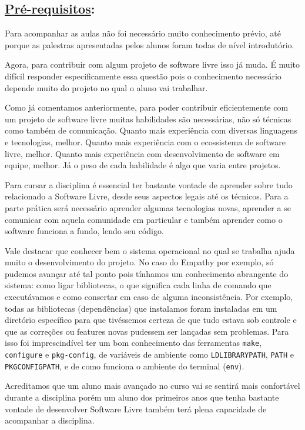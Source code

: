 \subsection*{\underline{Pré-requisitos}:}

Para acompanhar as aulas não foi necessário muito conhecimento prévio, até
porque as palestras apresentadas pelos alunos foram todas de nível introdutório.

Agora, para contribuir com algum projeto de software livre isso já muda. É muito
difícil responder especificamente essa questão pois o conhecimento necessário
depende muito do projeto no qual o aluno vai trabalhar.

Como já comentamos anteriormente, para poder contribuir eficientemente com um
projeto de software livre muitas habilidades são necessárias, não só técnicas
como também de comunicação. Quanto mais experiência com diversas linguagens e
tecnologias, melhor. Quanto mais experiência com o ecossistema de software
livre, melhor. Quanto mais experiência com desenvolvimento de software em
equipe, melhor. Já o peso de cada habilidade é algo que varia entre projetos.

Para cursar a disciplina é essencial ter bastante vontade de aprender sobre tudo
relacionado a Software Livre, desde seus aspectos legais até os técnicos. Para
a parte prática será necessário aprender algumas tecnologias novas, aprender a
se comunicar com aquela comunidade em particular e também aprender como o
software funciona a fundo, lendo seu código.

Vale destacar que conhecer bem o sistema operacional no qual se trabalha ajuda
muito o desenvolvimento do projeto. No caso do Empathy por exemplo, só pudemos
avançar até tal ponto pois tínhamos um conhecimento abrangente do sistema: como
ligar bibliotecas, o que significa cada linha de comando que executávamos e como
consertar em caso de alguma inconsistência. Por exemplo, todas as
bibliotecas (dependências) que instalamos foram instaladas em um diretório
específico para que tivéssemos certeza de que tudo  estava sob controle e que
as correções ou features novas pudessem ser lançadas sem problemas. Para isso
foi imprescindível ter um bom conhecimento das ferramentas \texttt{make},
\texttt{configure} e \texttt{pkg-config}, de variáveis de ambiente como
\texttt{LD\underline{\space}LIBRARY\underline{\space}PATH}, \texttt{PATH} e
\texttt{PKG\underline{\space}CONFIG\underline{\space}PATH}, e de como funciona
o ambiente do terminal (\texttt{env}).

Acreditamos que um aluno mais avançado no curso vai se sentirá mais confortável
durante a disciplina porém um aluno dos primeiros anos que tenha
bastante vontade de desenvolver Software Livre também terá plena capacidade de
acompanhar a disciplina.
